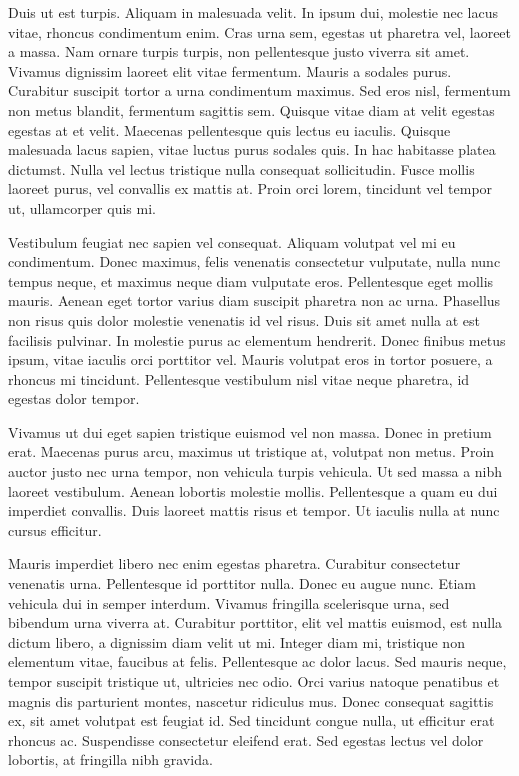 \documentclass{novel}
\begin{document}
Duis ut est turpis. Aliquam in malesuada velit. In ipsum dui, molestie nec lacus vitae, rhoncus condimentum enim. Cras urna sem, egestas ut pharetra vel, laoreet a massa. Nam ornare turpis turpis, non pellentesque justo viverra sit amet. Vivamus dignissim laoreet elit vitae fermentum. Mauris a sodales purus. Curabitur suscipit tortor a urna condimentum maximus. Sed eros nisl, fermentum non metus blandit, fermentum sagittis sem. Quisque vitae diam at velit egestas egestas at et velit. Maecenas pellentesque quis lectus eu iaculis. Quisque malesuada lacus sapien, vitae luctus purus sodales quis. In hac habitasse platea dictumst. Nulla vel lectus tristique nulla consequat sollicitudin. Fusce mollis laoreet purus, vel convallis ex mattis at. Proin orci lorem, tincidunt vel tempor ut, ullamcorper quis mi.

Vestibulum feugiat nec sapien vel consequat. Aliquam volutpat vel mi eu condimentum. Donec maximus, felis venenatis consectetur vulputate, nulla nunc tempus neque, et maximus neque diam vulputate eros. Pellentesque eget mollis mauris. Aenean eget tortor varius diam suscipit pharetra non ac urna. Phasellus non risus quis dolor molestie venenatis id vel risus. Duis sit amet nulla at est facilisis pulvinar. In molestie purus ac elementum hendrerit. Donec finibus metus ipsum, vitae iaculis orci porttitor vel. Mauris volutpat eros in tortor posuere, a rhoncus mi tincidunt. Pellentesque vestibulum nisl vitae neque pharetra, id egestas dolor tempor.

Vivamus ut dui eget sapien tristique euismod vel non massa. Donec in pretium erat. Maecenas purus arcu, maximus ut tristique at, volutpat non metus. Proin auctor justo nec urna tempor, non vehicula turpis vehicula. Ut sed massa a nibh laoreet vestibulum. Aenean lobortis molestie mollis. Pellentesque a quam eu dui imperdiet convallis. Duis laoreet mattis risus et tempor. Ut iaculis nulla at nunc cursus efficitur.

Mauris imperdiet libero nec enim egestas pharetra. Curabitur consectetur venenatis urna. Pellentesque id porttitor nulla. Donec eu augue nunc. Etiam vehicula dui in semper interdum. Vivamus fringilla scelerisque urna, sed bibendum urna viverra at. Curabitur porttitor, elit vel mattis euismod, est nulla dictum libero, a dignissim diam velit ut mi. Integer diam mi, tristique non elementum vitae, faucibus at felis. Pellentesque ac dolor lacus. Sed mauris neque, tempor suscipit tristique ut, ultricies nec odio. Orci varius natoque penatibus et magnis dis parturient montes, nascetur ridiculus mus. Donec consequat sagittis ex, sit amet volutpat est feugiat id. Sed tincidunt congue nulla, ut efficitur erat rhoncus ac. Suspendisse consectetur eleifend erat. Sed egestas lectus vel dolor lobortis, at fringilla nibh gravida.
\end{document}
